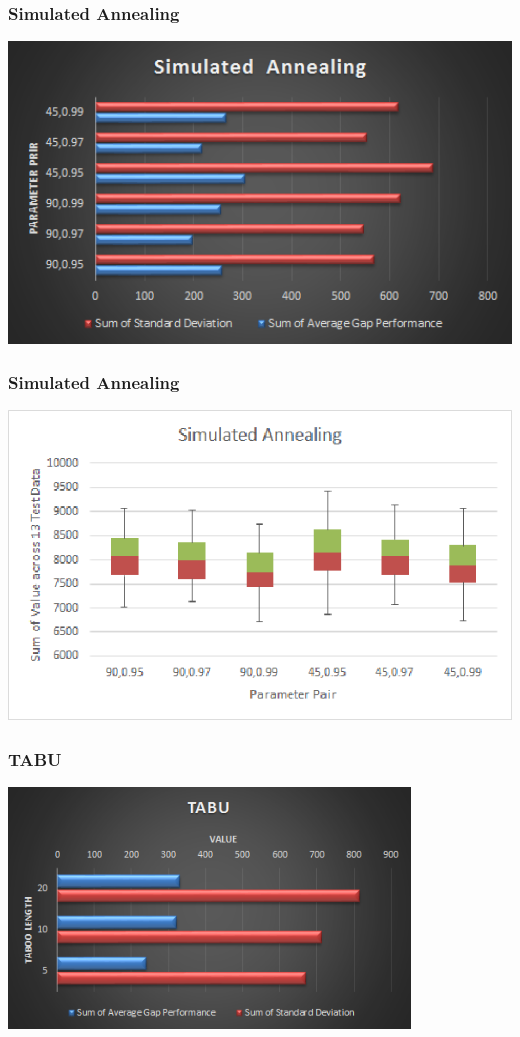 \documentclass{beamer}
\begin{document}
\begin{frame}
\frametitle{Simulated Annealing}
 \centerline{\includegraphics[width=1.0\textwidth]{simulated_annealing.png}}
\end{frame}
\begin{frame}
\frametitle{Simulated Annealing}
 \centerline{\includegraphics[width=1.0\textwidth]{simulated_annealing2.png}}
\end{frame}
\begin{frame}
\frametitle{TABU}
 \centerline{\includegraphics[width=0.8\textwidth]{TABU.png}}
\end{frame}
\end{document}
